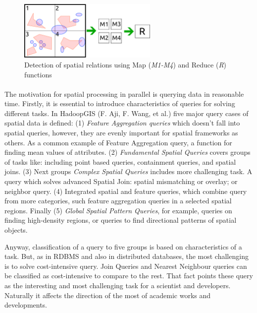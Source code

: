 \documentclass[a4paper,12pt,oneside]{report}
\begin{document}
	\begin{figure}[h!]
		\centering
		\includegraphics[width=0.6\textwidth]{./img/mapred_spatial.pdf}
		\caption[Spatial MapReduce]{\centering Detection of spatial relations using
			Map (\textit{M1-M4}) and Reduce (\textit{R}) functions}
		\label{fig:mapred_spatial}
	\end{figure}
	\paragraph{}
	
	The motivation for spatial processing in parallel is querying data in reasonable
	time. 
	Firstly, it is essential to introduce characteristics of queries for solving
	different 
	tasks. In HadoopGIS (F. Aji, F. Wang, et al.\cite{hadoopGIS})  five major 
	query cases of spatial data is defined: (1) \textit{Feature Aggregation queries}
	which doesn’t 
	fall into spatial queries, however, they are evenly important for spatial
	frameworks 
	as others. As a common example of Feature Aggregation query, a function for
	finding mean 
	values of attributes. 
	(2) \textit{Fundamental Spatial Queries} covers groups of tasks like: including
	point based 
	queries, containment queries, and spatial joins. (3) Next groups 
	\textit{ Complex Spatial Queries} includes more challenging task. A query which
	solves 
	advanced Spatial Join: spatial mismatching or overlay; or neighbor query. (4)
	Integrated 
	spatial and feature queries, which combine query from more categories, such
	feature 
	aggregation queries in a selected spatial regions. Finally (5) \textit{Global
		Spatial Pattern Queries}, for example, queries on finding high-density regions,
	or 
	queries to find directional patterns of spatial objects.
	
	Anyway, classification of a query to five groups is based on characteristics of
	a task. 
	But, as in RDBMS and also in distributed databases, the most challenging is to
	solve  cost-intensive query. 
	Join Queries and Nearest Neighbour queries can be classified as 
	cost-intensive to compare to the rest. That fact points these query as the
	interesting and
	most challenging task for a scientist and developers. Naturally it affects the
	direction of the most of academic works and developments.
	
\end{document}
